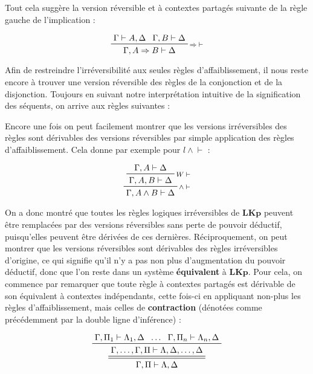 \documentclass[12pt]{report}
\newcommand{\lto}{\Rightarrow}
\newcommand{\seq}{\vdash}
\newcommand{\irule}[1]{\footnotesize$#1$}
\newcommand{\iruleL}[1]{\irule{{#1}\seq}}
\newcommand{\iruleR}[1]{\irule{\seq{#1}}}
\begin{document}
Tout cela suggère la version réversible et à contextes partagés suivante de la règle gauche de l'implication :

\begin{displaymath}
    \prftree[r]{\iruleL{\lto}}
        {\Gamma \seq A,\Delta}
        {\Gamma,B \seq \Delta}
        {\Gamma,A \lto B \seq \Delta}
\end{displaymath}

Afin de restreindre l'irréversibilité aux seules règles d'affaiblissement, il nous reste encore à trouver une version réversible des règles de la conjonction et de la disjonction. Toujours en suivant notre interprétation intuitive de la signification des séquents, on arrive aux règles suivantes :


Encore une fois on peut facilement montrer que les versions irréversibles des règles sont dérivables des versions réversibles par simple application des règles d'affaiblissement. Cela donne par exemple pour {\iruleL{l\land}} :

\begin{displaymath}
    \prftree[r]{\iruleL{\land}}
        {\prftree[r]{\iruleL{W}}
            {\Gamma,A \seq \Delta}
            {\Gamma,A,B \seq \Delta}}
        {\Gamma,A \land B \seq \Delta}
\end{displaymath}

On a donc montré que toutes les règles logiques irréversibles de $\mathbf{LKp}$ peuvent être remplacées par des versions réversibles sans perte de pouvoir déductif, puisqu'elles peuvent être dérivées de ces dernières. Réciproquement, on peut montrer que les versions réversibles sont dérivables des règles irréversibles d'origine, ce qui signifie qu'il n'y a pas non plus d'augmentation du pouvoir déductif, donc que l'on reste dans un système \textbf{équivalent} à $\mathbf{LKp}$. Pour cela, on commence par remarquer que toute règle à contextes partagés est dérivable de son équivalent à contextes indépendants, cette fois-ci en appliquant non-plus les règles d'affaiblissement, mais celles de \textbf{contraction} (dénotées comme précédemment par la double ligne d'inférence) :

\begin{displaymath}
    \prftree[d]
        {\prftree
            {\Gamma,\Pi_1 \seq \Lambda_1,\Delta}
            {\ldots}
            {\Gamma,\Pi_n \seq \Lambda_n,\Delta}
            {\Gamma,\ldots,\Gamma,\Pi \seq \Lambda,\Delta,\ldots,\Delta}}
        {\Gamma,\Pi \seq \Lambda,\Delta}
\end{displaymath}
\end{document}
